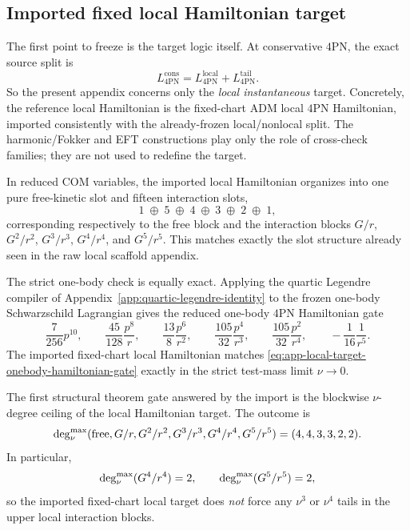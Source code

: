 \documentclass[11pt]{article}
\begin{document}
\subsection{Imported fixed local Hamiltonian target}
\label{app:imported-local-target-hamiltonian-chart}

The first point to freeze is the target logic itself.  At conservative \(4\)PN,
the exact source split is
\begin{equation}
L_{4\mathrm{PN}}^{\mathrm{cons}}
=
L_{4\mathrm{PN}}^{\mathrm{local}}
+
L_{4\mathrm{PN}}^{\mathrm{tail}}.
\label{eq:app-local-target-split}
\end{equation}
So the present appendix concerns only the \emph{local instantaneous} target.
Concretely, the reference local Hamiltonian is the fixed-chart ADM local
\(4\)PN Hamiltonian, imported consistently with the already-frozen
local/nonlocal split.  The harmonic/Fokker and EFT constructions play only the
role of cross-check families; they are not used to redefine the target.

In reduced COM variables, the imported local Hamiltonian organizes into one pure
free-kinetic slot and fifteen interaction slots,
\begin{equation}
1\;\oplus\;5\;\oplus\;4\;\oplus\;3\;\oplus\;2\;\oplus\;1,
\label{eq:app-local-target-slot-structure}
\end{equation}
corresponding respectively to the free block and the interaction blocks
\(G/r\), \(G^2/r^2\), \(G^3/r^3\), \(G^4/r^4\), and \(G^5/r^5\).
This matches exactly the slot structure already seen in the raw local scaffold
appendix.

The strict one-body check is equally exact.  Applying the quartic Legendre
compiler of Appendix~\ref{app:quartic-legendre-identity} to the frozen
one-body Schwarzschild Lagrangian gives the reduced one-body \(4\)PN
Hamiltonian gate
\begin{equation}
\frac{7}{256}p^{10},
\qquad
\frac{45}{128}\frac{p^8}{r},
\qquad
\frac{13}{8}\frac{p^6}{r^2},
\qquad
\frac{105}{32}\frac{p^4}{r^3},
\qquad
\frac{105}{32}\frac{p^2}{r^4},
\qquad
-\frac{1}{16}\frac{1}{r^5}.
\label{eq:app-local-target-onebody-hamiltonian-gate}
\end{equation}
The imported fixed-chart local Hamiltonian matches
\eqref{eq:app-local-target-onebody-hamiltonian-gate} exactly in the strict
test-mass limit \(\nu\to0\).

The first structural theorem gate answered by the import is the blockwise
\(\nu\)-degree ceiling of the local Hamiltonian target.  The outcome is
\begin{equation}
\deg_{\nu}^{\rm max}(\text{free},G/r,G^2/r^2,G^3/r^3,G^4/r^4,G^5/r^5)
=
(4,4,3,3,2,2).
\label{eq:app-local-target-hamiltonian-degree-ceilings}
\end{equation}
In particular,
\begin{equation}
\deg_{\nu}^{\rm max}(G^4/r^4)=2,
\qquad
\deg_{\nu}^{\rm max}(G^5/r^5)=2,
\label{eq:app-local-target-upper-block-cutoff}
\end{equation}
so the imported fixed-chart local target does \emph{not} force any \(\nu^3\) or
\(\nu^4\) tails in the upper local interaction blocks.
\end{document}
